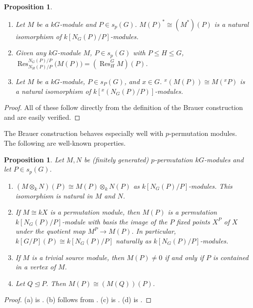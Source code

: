 \documentclass[10pt,letterpaper, boxed, cm]{amsart}
\newcommand{\Res}{\operatorname{Res}}
\newtheorem{prop}[theorem]{Proposition}
\theoremstyle{remark}
\theoremstyle{definition}
\begin{document}
	\begin{prop}\label{brauercommuteswithdualsandconj}
		\begin{enumerate}
			\item Let $M$ be a $kG$-module and $P\in s_p(G)$. $M(P)^* \cong (M^*)(P)$ is a natural isomorphism of $k[N_G(P)/P]$-modules.
			\item Given any $kG$-module $M$, $P \in s_p(G)$ with $P \leq H \leq G$, $\Res^{N_G(P)/P}_{N_H(P)/P} \big(M(P)\big) = \left(\Res_H^G M\right)(P)$.
			\item Let $M$ be a $kG$-module, $P \in s_P(G)$, and $x \in G$. ${}^x(M(P)) \cong M({}^xP)$ is a natural isomorphism of $k[{}^x(N_G(P)/P)]$-modules.
		\end{enumerate}
	\end{prop}
	\begin{proof}
	    All of these follow directly from the definition of the Brauer construction and are easily verified.
	\end{proof}

	The Brauer construction behaves especially well with $p$-permutation modules. The following are well-known properties.

	\begin{prop} \label{brauerppermproperties}
        Let $M,N$ be (finitely generated) $p$-permutation $kG$-modules and let $P \in s_p(G)$.
		\begin{enumerate}
			\item $(M\otimes_k N)(P) \cong M(P) \otimes_k N(P)$ as $k[N_G(P)/P]$-modules. This isomorphism is natural in $M$ and $N$.
			\item If $M \cong kX$ is a permutation module, then $M(P)$ is a permutation $k[N_G(P)/P]$-module with basis the image of the $P$ fixed points $X^P$ of $X$ under the quotient map $M^P \to M(P)$. In particular, $k[G/P](P) \cong k[N_G(P)/P]$ naturally as $k[N_G(P)/P]$-modules.
			\item If $M$ is a trivial source module, then $M(P) \neq 0$ if and only if $P$ is contained in a vertex of $M$.
			\item Let $Q \trianglelefteq P$. Then $M(P) \cong \left(M(Q)\right)(P)$.
		\end{enumerate}
	\end{prop}
    \begin{proof}
        (a) is \cite[Proposition 5.8.10]{L181}. (b) follows from \cite[Proposition 5.8.1]{L181}. (c) is \cite[Proposition 5.10.3]{L181}. (d) is \cite[Proposition 5.8.5]{L181}.
    \end{proof}
\end{document}
